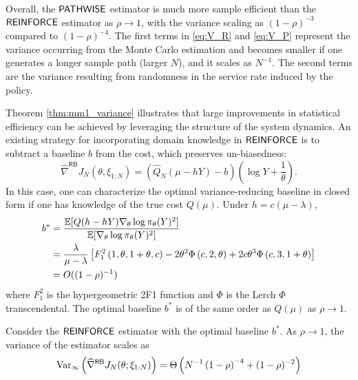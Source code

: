 Overall, the $\mathsf{PATHWISE}$ estimator is much more sample efficient than the $\mathsf{REINFORCE}$ estimator as $\rho \to 1$, with the variance scaling as $(1-\rho)^{-3}$ compared to $(1-\rho)^{-4}$.
The first terms in \eqref{eq:V_R} and \eqref{eq:V_P} represent the variance occurring from the Monte Carlo estimation and becomes smaller if one generates a longer sample path (larger $N$), and it scales as $N^{-1}$. The second terms are the variance resulting from randomness in the service rate induced by the policy. 





Theorem \ref{thm:mm1_variance} illustrates that large improvements in statistical efficiency can be achieved by leveraging the structure of the system dynamics. An existing strategy for incorporating domain knowledge in $\mathsf{REINFORCE}$ is to subtract a baseline $b$ from the cost, which preserves un-biasedness:
\begin{equation}
\label{eq:mm1-reinforce-baseline}
\widehat{\nabla}^{\mathsf{RB}} J_{N}
(\theta, \xi_{1:N})
= (\widehat{Q}_{N}(\mu - hY) - b) \left( \log Y + \frac{1}{\theta} \right).
\end{equation}
In this case, one can characterize the optimal variance-reducing baseline in closed form if one has knowledge of the true cost $Q(\mu)$. Under $h = c(\mu - \lambda)$,
\begin{align*}
b^{*} &= \frac{\mathbb{E}[Q(h-hY) \nabla_{\theta} \log \pi_{\theta}(Y)^{2}]}{\mathbb{E}[\nabla_{\theta}\log \pi_{\theta}(Y)^{2}]} \\
&= \frac{\lambda}{\mu - \lambda}\left[F^{2}_{1}\left(1,\theta,1+\theta,c\right) -2\theta^{2}\Phi\left(c,2,\theta\right) + 2c\theta^{3}\Phi\left(c,3,1+\theta\right)\right] \\
& = O((1-\rho)^{-1})
\end{align*}
where $F^{2}_{1}$ is the hypergeometric 2F1 function and $\Phi$ is the Lerch $\Phi$ transcendental. The optimal baseline $b^{*}$ is of the same order as $Q(\mu)$ as $\rho \to 1$.
\begin{corollary}
\label{cor:reinforce-baseline}
Consider the $\mathsf{REINFORCE}$ estimator with the optimal baseline $b^{*}$. As $\rho \to 1$, the variance of the estimator scales as
\[
{\rm Var}_{\infty}\left(\widehat{\nabla}^{\mathsf{RB}} J_{N}(\theta; \xi_{1:N}) \right) = \Theta 
\left( N^{-1} \left(1 -\rho\right)^{-4} 
+(1-\rho)^{-2}
\right)
\]
\end{corollary}

